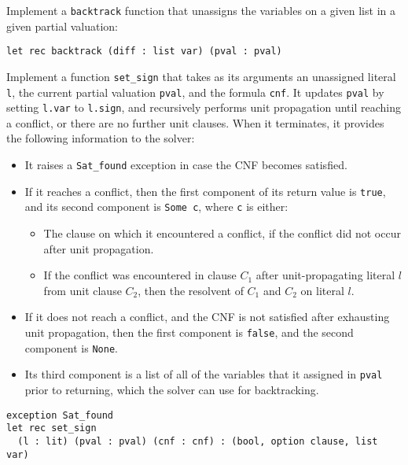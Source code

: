 \documentclass[11pt]{article}
\begin{document}
\begin{task}[5 pts] 
Implement a \verb|backtrack| function that unassigns the variables on a given list in a given partial valuation:
\begin{lstlisting}
let rec backtrack (diff : list var) (pval : pval)
\end{lstlisting}
\end{task}

\begin{task}[20 pts] 
Implement a function \verb|set_sign| that takes as its arguments an unassigned literal \verb'l', the current partial valuation \verb'pval', and the formula \verb'cnf'. It updates \verb'pval' by setting \verb'l.var' to \verb'l.sign', and recursively performs unit propagation until reaching a conflict, or there are no further unit clauses.
When it terminates, it provides the following information to the solver:
\begin{itemize}[itemsep=1pt,topsep=1pt,partopsep=10pt,parsep=1pt]
  \setlength\itemsep{0em}
  \setlength\partopsep{0em}
\item It raises a \verb|Sat_found| exception in case the CNF becomes satisfied.
\item If it reaches a conflict, then the first component of its return value is \verb'true', and its second component is \verb'Some c', where \verb'c' is either:
  \begin{itemize}[itemsep=1pt,topsep=1pt,partopsep=10pt,parsep=1pt]
    \setlength\itemsep{0em}
    \setlength\partopsep{0em}
    \item The clause on which it encountered a conflict, if the conflict did not occur after unit propagation.
    \item If the conflict was encountered in clause $C_1$ after unit-propagating literal $l$ from unit clause $C_2$, then the resolvent of $C_1$ and $C_2$ on literal $l$.
  \end{itemize}
\item If it does not reach a conflict, and the CNF is not satisfied after exhausting unit propagation, then the first component is \verb'false', and the second component is \verb'None'.
\item Its third component is a list of all of the variables that it assigned in \verb'pval' prior to returning, which the solver can use for backtracking.
\end{itemize}

\begin{lstlisting}
exception Sat_found
let rec set_sign 
  (l : lit) (pval : pval) (cnf : cnf) : (bool, option clause, list var)
\end{lstlisting}
\end{task}
\end{document}
